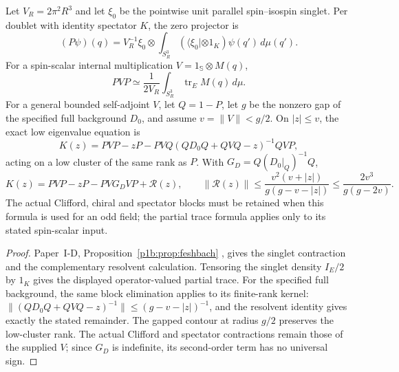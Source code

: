 \documentclass[11pt,a4paper]{article}
\begin{document}
\begin{theorem}
\label{p3f:thm:m8td-low-mode}
Let $V_R=2\pi^2R^3$ and let $\xi_0$ be the pointwise unit parallel
spin--isospin singlet. Per doublet with identity spectator $K$, the zero
projector is
\[
 (P\psi)(q)=V_R^{-1}\xi_0\otimes
 \int_{S_R^3}(\langle\xi_0|\otimes1_K)\psi(q')\,d\mu(q').
\]
For a spin-scalar internal multiplication $V=1_{\mathbb S}\otimes M(q)$,
\begin{equation}
 PVP\simeq\frac1{2V_R}\int_{S_R^3}\operatorname{tr}_E M(q)\,d\mu.
 \label{p3f:eq:m8td-partial-trace}
\end{equation}
For a general bounded self-adjoint $V$, let $Q=1-P$, let $g$ be the
nonzero gap of the specified full background $D_0$, and assume
$v=\|V\|<g/2$. On $|z|\le v$, the exact low eigenvalue equation is
\begin{equation}
 K(z)=PVP-zP-PVQ(QD_0Q+QVQ-z)^{-1}QVP,
 \label{p3f:eq:m8td-feshbach}
\end{equation}
acting on a low cluster of the same rank as $P$. With
$G_D=Q(D_0|_Q)^{-1}Q$,
\[
 K(z)=PVP-zP-PVG_DVP+\mathcal R(z),\qquad
 \|\mathcal R(z)\|\le\frac{v^2(v+|z|)}{g(g-v-|z|)}
 \le\frac{2v^3}{g(g-2v)}.
\]
The actual Clifford, chiral and spectator blocks must be retained when
this formula is used for an odd field; the partial trace formula applies
only to its stated spin-scalar input.
\end{theorem}
\begin{proof}
Paper~I-D, Proposition~\ref{p1b:prop:feshbach}
\cite{Kugelmann2026Paper1D}, gives the singlet contraction and the
complementary resolvent calculation. Tensoring the singlet density
\(I_E/2\) by \(1_K\) gives the displayed operator-valued partial trace.
For the specified full background, the same block elimination applies to
its finite-rank kernel: \(\|(QD_0Q+QVQ-z)^{-1}\|\le(g-v-|z|)^{-1}\),
and the resolvent identity gives exactly the stated remainder.
The gapped contour at radius \(g/2\) preserves the low-cluster rank.
The actual Clifford and spectator contractions remain those of the supplied
\(V\); since \(G_D\) is indefinite, its second-order term has no universal sign.
\end{proof}
\end{document}
